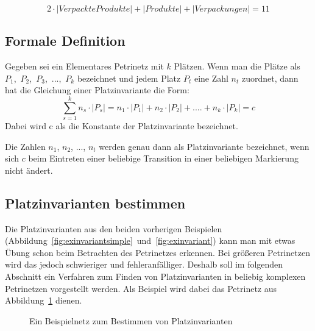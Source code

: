 		$$2\cdot|Verpackte Produkte| + |Produkte| + |Verpackungen| = 11$$

	\subsection{Formale Definition}
	\label{sub:formale_definition}
		Gegeben sei ein Elementares Petrinetz mit $k$ Plätzen. Wenn man die Plätze als $P_1$,~$P_2$,~$P_3$,~...,~$P_k$ bezeichnet und jedem Platz $P_t$ eine Zahl $n_t$ zuordnet, dann hat die Gleichung einer Platzinvariante die Form:
		$$
		\sum_{s=1}^k n_s \cdot |P_s| = n_1 \cdot |P_1| + n_2 \cdot |P_2| + .... + n_k \cdot |P_k| = c
		$$
		Dabei wird c als die Konstante der Platzinvariante bezeichnet. 

		Die Zahlen $n_1$, $n_2$, ..., $n_t$ werden genau dann als Platzinvariante bezeichnet, wenn sich $c$ beim Eintreten einer beliebige Transition in einer beliebigen Markierung nicht ändert.

	\subsection{Platzinvarianten bestimmen}
		Die Platzinvarianten aus den beiden vorherigen Beispielen (Abbildung~\ref{fig:exinvariantsimple}~und~\ref{fig:exinvariant}) kann man mit etwas Übung schon beim Betrachten des Petrinetzes erkennen. Bei größeren Petrinetzen wird das jedoch schwieriger und fehleranfälliger. Deshalb soll im folgenden Abschnitt ein Verfahren zum Finden von Platzinvarianten in beliebig komplexen Petrinetzen vorgestellt werden. Als Beispiel wird dabei das Petrinetz aus Abbildung~\ref{fig:invariantdemo} dienen.

		\begin{figure}[h]
			\centering
			\caption{Ein Beispielnetz zum Bestimmen von Platzinvarianten}
			\label{fig:invariantdemo}
		\end{figure}

